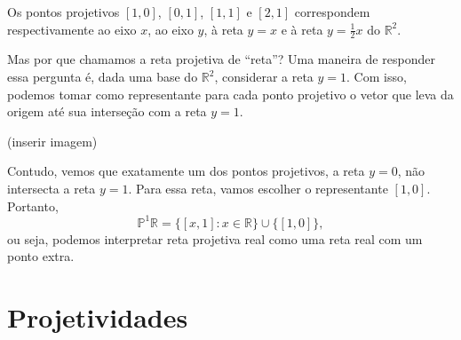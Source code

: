 \begin{exmp}
Os pontos projetivos $[1,0]$, $[0,1]$, $[1,1]$ e $[2,1]$ correspondem respectivamente ao eixo $x$, ao eixo $y$, à reta $y=x$ e à reta $y=\frac{1}{2}x$ do $\mathbb{R}^2$.
\end{exmp}

Mas por que chamamos a reta projetiva de ``reta''? Uma maneira de responder essa pergunta é, dada uma base do $\mathbb{R}^2$, considerar a reta $y=1$. Com isso, podemos tomar como representante para cada ponto projetivo o vetor que leva da origem até sua interseção  com a reta $y=1$.

(inserir imagem)

Contudo, vemos que exatamente um dos pontos projetivos, a reta \(y = 0\), não intersecta a reta \(y = 1\).
Para essa reta, vamos escolher o representante $[1,0]$.
Portanto, \[\mathbb{P}^1\mathbb{R} = \{ [x,1] : x \in \mathbb{R} \} \cup \{[1,0]\},\]
ou seja, podemos interpretar reta projetiva real como uma reta real com um ponto extra.

\section{Projetividades}
